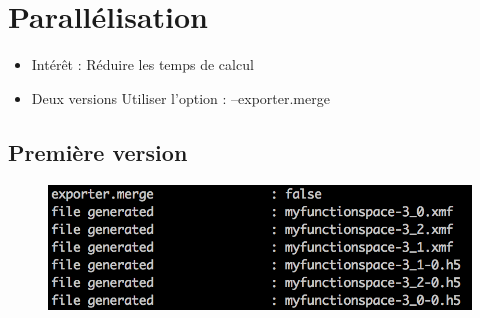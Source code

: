 \documentclass{beamer}
\begin{document}
\section{Parallélisation}
\begin{frame}
\begin{itemize}
\item Intérêt : Réduire les temps de calcul
\item Deux versions\newline
Utiliser l'option : --exporter.merge
\end{itemize}
\end{frame}
\subsection{Première version}
\begin{frame}
\begin{figure}
\begin{center}
\includegraphics [width=\textwidth] {Parallele1.png}
\end{center}
\end{figure}
\end{frame}
\end{document}
